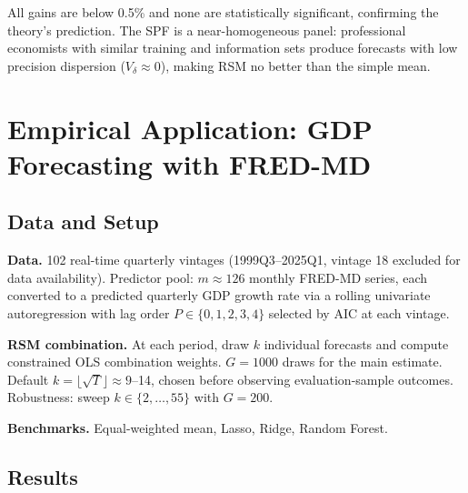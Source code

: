 \documentclass[12pt,a4paper]{article}
\theoremstyle{definition}
\begin{document}
All gains are below 0.5\% and none are statistically significant, confirming
the theory's prediction.  The SPF is a near-homogeneous panel: professional
economists with similar training and information sets produce forecasts with
low precision dispersion ($V_\delta\approx 0$), making RSM no better than
the simple mean.

\section{Empirical Application: GDP Forecasting with FRED-MD}
\label{sec:gdp}

\subsection{Data and Setup}

\textbf{Data.} 102 real-time quarterly vintages (1999Q3--2025Q1, vintage
18 excluded for data availability).  Predictor pool: $m\approx 126$ monthly
FRED-MD series, each converted to a predicted quarterly GDP growth rate via
a rolling univariate autoregression with lag order $P\in\{0,1,2,3,4\}$
selected by AIC at each vintage.

\textbf{RSM combination.} At each period, draw $k$ individual forecasts and
compute constrained OLS combination weights.  $G=1000$ draws for the main
estimate.  Default $k=\lfloor\sqrt{T}\rfloor\approx 9$--14, chosen before
observing evaluation-sample outcomes.  Robustness: sweep $k\in\{2,\ldots,55\}$
with $G=200$.

\textbf{Benchmarks.} Equal-weighted mean, Lasso, Ridge, Random Forest.

\subsection{Results}
\end{document}
